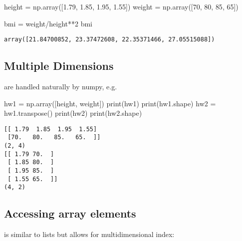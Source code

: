 \documentclass[
  letterpaper,
  DIV=11,
  numbers=noendperiod]{scrreprt}
\newenvironment{Shaded}{\begin{snugshade}}{\end{snugshade}}
\newcommand{\BuiltInTok}[1]{\textcolor[rgb]{0.00,0.23,0.31}{#1}}
\newcommand{\DecValTok}[1]{\textcolor[rgb]{0.68,0.00,0.00}{#1}}
\newcommand{\FloatTok}[1]{\textcolor[rgb]{0.68,0.00,0.00}{#1}}
\newcommand{\NormalTok}[1]{\textcolor[rgb]{0.00,0.23,0.31}{#1}}
\newcommand{\OperatorTok}[1]{\textcolor[rgb]{0.37,0.37,0.37}{#1}}
\begin{document}
\begin{Shaded}
\begin{Highlighting}[]
\NormalTok{height }\OperatorTok{=}\NormalTok{ np.array([}\FloatTok{1.79}\NormalTok{, }\FloatTok{1.85}\NormalTok{, }\FloatTok{1.95}\NormalTok{, }\FloatTok{1.55}\NormalTok{])}
\NormalTok{weight }\OperatorTok{=}\NormalTok{ np.array([}\DecValTok{70}\NormalTok{, }\DecValTok{80}\NormalTok{, }\DecValTok{85}\NormalTok{, }\DecValTok{65}\NormalTok{])}

\NormalTok{bmi }\OperatorTok{=}\NormalTok{ weight}\OperatorTok{/}\NormalTok{height}\OperatorTok{**}\DecValTok{2}
\NormalTok{bmi}
\end{Highlighting}
\end{Shaded}

\begin{verbatim}
array([21.84700852, 23.37472608, 22.35371466, 27.05515088])
\end{verbatim}

\hypertarget{multiple-dimensions}{%
\subsection{Multiple Dimensions}\label{multiple-dimensions}}

are handled naturally by numpy, e.g.

\begin{Shaded}
\begin{Highlighting}[]
\NormalTok{hw1 }\OperatorTok{=}\NormalTok{ np.array([height, weight])}
\BuiltInTok{print}\NormalTok{(hw1)}
\BuiltInTok{print}\NormalTok{(hw1.shape)}
\NormalTok{hw2 }\OperatorTok{=}\NormalTok{ hw1.transpose()}
\BuiltInTok{print}\NormalTok{(hw2)}
\BuiltInTok{print}\NormalTok{(hw2.shape)}
\end{Highlighting}
\end{Shaded}

\begin{verbatim}
[[ 1.79  1.85  1.95  1.55]
 [70.   80.   85.   65.  ]]
(2, 4)
[[ 1.79 70.  ]
 [ 1.85 80.  ]
 [ 1.95 85.  ]
 [ 1.55 65.  ]]
(4, 2)
\end{verbatim}

\hypertarget{accessing-array-elements}{%
\subsection{Accessing array elements}\label{accessing-array-elements}}

is similar to lists but allows for multidimensional index:
\end{document}
